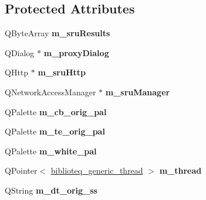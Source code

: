 \subsection*{Protected Attributes}
\begin{DoxyCompactItemize}
\item 
Q\+Byte\+Array {\bfseries m\+\_\+sru\+Results}\hypertarget{classbiblioteq__magazine_aa323a2c4ad4ced05d7c29e25dc737d35}{}\label{classbiblioteq__magazine_aa323a2c4ad4ced05d7c29e25dc737d35}

\item 
Q\+Dialog $\ast$ {\bfseries m\+\_\+proxy\+Dialog}\hypertarget{classbiblioteq__magazine_a9bc0a7a5e2037652659499a8b651ffbd}{}\label{classbiblioteq__magazine_a9bc0a7a5e2037652659499a8b651ffbd}

\item 
Q\+Http $\ast$ {\bfseries m\+\_\+sru\+Http}\hypertarget{classbiblioteq__magazine_a0edec00c791d597fad5c30e91b51f5fe}{}\label{classbiblioteq__magazine_a0edec00c791d597fad5c30e91b51f5fe}

\item 
Q\+Network\+Access\+Manager $\ast$ {\bfseries m\+\_\+sru\+Manager}\hypertarget{classbiblioteq__magazine_ad8141d59f535cf3d03476e5b1ac2aec4}{}\label{classbiblioteq__magazine_ad8141d59f535cf3d03476e5b1ac2aec4}

\item 
Q\+Palette {\bfseries m\+\_\+cb\+\_\+orig\+\_\+pal}\hypertarget{classbiblioteq__magazine_a12c0a24b9abfb1b9ff5a2e18678e4997}{}\label{classbiblioteq__magazine_a12c0a24b9abfb1b9ff5a2e18678e4997}

\item 
Q\+Palette {\bfseries m\+\_\+te\+\_\+orig\+\_\+pal}\hypertarget{classbiblioteq__magazine_a168b40414fedf417fe53d85bb0183455}{}\label{classbiblioteq__magazine_a168b40414fedf417fe53d85bb0183455}

\item 
Q\+Palette {\bfseries m\+\_\+white\+\_\+pal}\hypertarget{classbiblioteq__magazine_a1ac7f3617c7433be0a3b58995bb0a83f}{}\label{classbiblioteq__magazine_a1ac7f3617c7433be0a3b58995bb0a83f}

\item 
Q\+Pointer$<$ \hyperlink{classbiblioteq__generic__thread}{biblioteq\+\_\+generic\+\_\+thread} $>$ {\bfseries m\+\_\+thread}\hypertarget{classbiblioteq__magazine_a600a4c29510430526eae82bd7d11e246}{}\label{classbiblioteq__magazine_a600a4c29510430526eae82bd7d11e246}

\item 
Q\+String {\bfseries m\+\_\+dt\+\_\+orig\+\_\+ss}\hypertarget{classbiblioteq__magazine_a48689c815bab3c63e1b39af0ac966eeb}{}\label{classbiblioteq__magazine_a48689c815bab3c63e1b39af0ac966eeb}


\end{DoxyCompactItemize}
